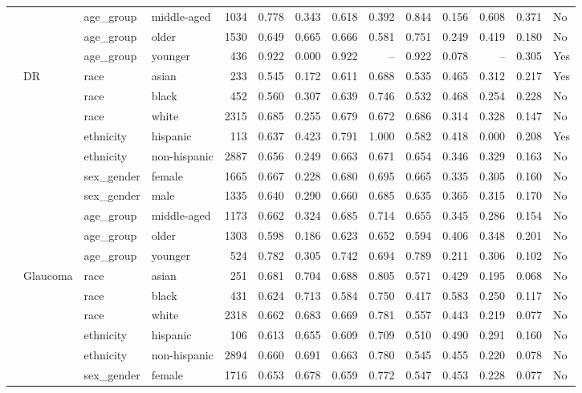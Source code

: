 \begin{longtable}{@{}lll l rrrrrrrr@{}}
 &  & age\_group & middle-aged & 1034 & 0.778 & 0.343 & 0.618 & 0.392 & 0.844 & 0.156 & 0.608 & 0.371 & No \\
 &  & age\_group & older & 1530 & 0.649 & 0.665 & 0.666 & 0.581 & 0.751 & 0.249 & 0.419 & 0.180 & No \\
 &  & age\_group & younger & 436 & 0.922 & 0.000 & 0.922 & -- & 0.922 & 0.078 & -- & 0.305 & Yes \\
 & DR & race & asian & 233 & 0.545 & 0.172 & 0.611 & 0.688 & 0.535 & 0.465 & 0.312 & 0.217 & Yes \\
 &  & race & black & 452 & 0.560 & 0.307 & 0.639 & 0.746 & 0.532 & 0.468 & 0.254 & 0.228 & No \\
 &  & race & white & 2315 & 0.685 & 0.255 & 0.679 & 0.672 & 0.686 & 0.314 & 0.328 & 0.147 & No \\
 &  & ethnicity & hispanic & 113 & 0.637 & 0.423 & 0.791 & 1.000 & 0.582 & 0.418 & 0.000 & 0.208 & Yes \\
 &  & ethnicity & non-hispanic & 2887 & 0.656 & 0.249 & 0.663 & 0.671 & 0.654 & 0.346 & 0.329 & 0.163 & No \\
 &  & sex\_gender & female & 1665 & 0.667 & 0.228 & 0.680 & 0.695 & 0.665 & 0.335 & 0.305 & 0.160 & No \\
 &  & sex\_gender & male & 1335 & 0.640 & 0.290 & 0.660 & 0.685 & 0.635 & 0.365 & 0.315 & 0.170 & No \\
 &  & age\_group & middle-aged & 1173 & 0.662 & 0.324 & 0.685 & 0.714 & 0.655 & 0.345 & 0.286 & 0.154 & No \\
 &  & age\_group & older & 1303 & 0.598 & 0.186 & 0.623 & 0.652 & 0.594 & 0.406 & 0.348 & 0.201 & No \\
 &  & age\_group & younger & 524 & 0.782 & 0.305 & 0.742 & 0.694 & 0.789 & 0.211 & 0.306 & 0.102 & No \\
 & Glaucoma & race & asian & 251 & 0.681 & 0.704 & 0.688 & 0.805 & 0.571 & 0.429 & 0.195 & 0.068 & No \\
 &  & race & black & 431 & 0.624 & 0.713 & 0.584 & 0.750 & 0.417 & 0.583 & 0.250 & 0.117 & No \\
 &  & race & white & 2318 & 0.662 & 0.683 & 0.669 & 0.781 & 0.557 & 0.443 & 0.219 & 0.077 & No \\
 &  & ethnicity & hispanic & 106 & 0.613 & 0.655 & 0.609 & 0.709 & 0.510 & 0.490 & 0.291 & 0.160 & No \\
 &  & ethnicity & non-hispanic & 2894 & 0.660 & 0.691 & 0.663 & 0.780 & 0.545 & 0.455 & 0.220 & 0.078 & No \\
 &  & sex\_gender & female & 1716 & 0.653 & 0.678 & 0.659 & 0.772 & 0.547 & 0.453 & 0.228 & 0.077 & No \\

\end{longtable}
